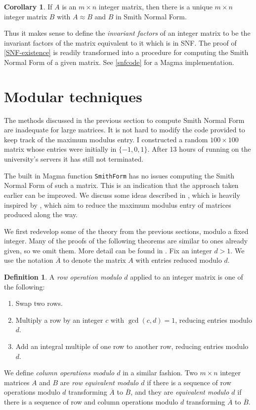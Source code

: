 \documentclass[12pt,a4paper]{article}
\theoremstyle{definition}
\newtheorem{definition}[theorem]{Definition}
\newtheorem{corollary}[theorem]{Corollary}
\begin{document}
\begin{corollary}
  If $A$ is an $m\times n$ integer matrix, then there is a unique $m\times n$ integer matrix $B$ with $A\approx B$ and $B$ in Smith Normal Form.
\end{corollary}

Thus it makes sense to define the \emph{invariant factors} of an integer matrix to be the invariant factors of the matrix equivalent to it which is in SNF. The proof of \autoref{SNF-existence} is readily transformed into a procedure for computing the Smith Normal Form of a given matrix. See \autoref{snfcode} for a {\sc Magma} implementation.

\section{Modular techniques}
\label{modular-discussion}

The methods discussed in the previous section to compute Smith Normal Form are inadequate for large matrices. It is not hard to modify the code provided to keep track of the maximum modulus entry.  I constructed a random $100\times100$ matrix whose entries were initially in $\{-1,0,1\}$. After 13 hours of running on the university's servers it has still not terminated. 

The built in {\sc Magma} function \texttt{SmithForm} has no issues computing the Smith Normal Form of such a matrix. This is an indication that the approach taken earlier can be improved. We discuss some ideas described in \cite{sims}, which is heavily inspired by \cite{havas}, which aim to reduce the maximum modulus entry of matrices produced along the way.

We first redevelop some of the theory from the previous sections, modulo a fixed integer. Many of the proofs of the following theorems are similar to ones already given, so we omit them. More detail can be found in \cite{sims}. Fix an integer $d>1$. We use the notation $\overline{A}$ to denote the matrix $A$ with entries reduced modulo $d$.

\begin{definition}
  A \emph{row operation modulo $d$} applied to an integer matrix is one of the following:
  \begin{enumerate}
  \item Swap two rows.
  \item Multiply a row by an integer $c$ with $\gcd(c,d)=1$, reducing entries modulo $d$.
  \item Add an integral multiple of one row to another row, reducing entries modulo $d$.
  \end{enumerate}
  We define \emph{column operations modulo $d$} in a similar fashion. Two $m\times n$ integer matrices $A$ and $B$ are \emph{row equivalent modulo $d$} if there is a sequence of row operations modulo $d$ transforming $\overline{A}$ to $\overline{B}$, and they are \emph{equivalent modulo $d$} if there is a sequence of row and column operations modulo $d$ transforming $\overline{A}$ to $\overline{B}$.
\end{definition}
\end{document}
